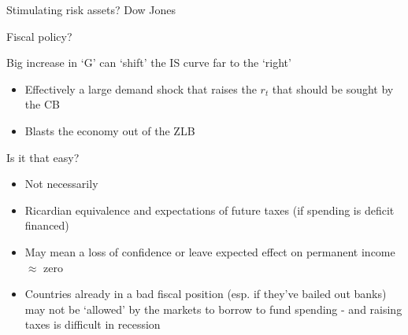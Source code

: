\begin{frame}{Stimulating risk assets? Dow Jones}

\begin{figure}
\begin{center}


\end{center}
\end{figure}

\end{frame}


	
\begin{frame}{Fiscal policy?}

Big increase in `G' can `shift' the IS curve far to the `right'
\begin{itemize}
\item	Effectively a large demand shock that raises the $r_{t}$ that should be sought by the CB
\item	Blasts the economy out of the ZLB
\end{itemize}

\vspace{2mm}
Is it that easy?
	\begin{itemize}
	\item	Not necessarily
	\item	Ricardian equivalence and expectations of future taxes (if spending is deficit financed)
	\item	May mean a loss of confidence or leave expected effect on permanent income $\approx$ zero
	\item	Countries already in a bad fiscal position (esp. if they've bailed out banks) may not be `allowed' by the markets to borrow to fund spending - and raising taxes is difficult in recession
	\end{itemize}
	
\end{frame}